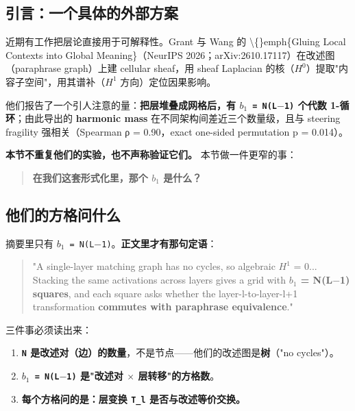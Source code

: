 \documentclass[11pt,a4paper]{ctexart}
\begin{document}
\subsection{引言：一个具体的外部方案}

近期有工作把层论直接用于可解释性。Grant 与 Wang 的 \textbackslash\{\}emph\{Gluing Local Contexts into Global Meaning\}（NeurIPS 2026；arXiv:2610.17117）在改述图（paraphrase graph）上建 cellular sheaf，用 sheaf Laplacian 的核（\texttt{\ensuremath{H^{0}}}）提取"内容子空间"，用其谱补（\texttt{\ensuremath{H^{1}}} 方向）定位因果影响。

他们报告了一个引人注意的量：\textbf{把层堆叠成网格后，有 \texttt{\ensuremath{b_{1}} = N(L\ensuremath{-}1)} 个代数 1-循环}；由此导出的 \textbf{harmonic mass} 在不同架构间差近三个数量级，且与 steering fragility 强相关（Spearman ρ = 0.90，exact one-sided permutation p = 0.014）。

\textbf{本节不重复他们的实验，也不声称验证它们。} 本节做一件更窄的事：

\begin{quote}
\textbf{在我们这套形式化里，那个 \texttt{\ensuremath{b_{1}}} 是什么？}
\end{quote}

\subsection{他们的方格问什么}

摘要里只有 \texttt{\ensuremath{b_{1}} = N(L\ensuremath{-}1)}。\textbf{正文里才有那句定语}：

\begin{quote}
"A single-layer matching graph has no cycles, so algebraic \ensuremath{H^{1}} = 0... Stacking the same activations across layers gives a grid with \textbf{\ensuremath{b_{1}} = N(L\ensuremath{-}1) squares}, and each square asks whether the layer-l-to-layer-l+1 transformation \textbf{commutes with paraphrase equivalence}."
\end{quote}

三件事必须读出来：

\begin{enumerate}
\item \textbf{\texttt{N} 是改述对（边）的数量}，不是节点——他们的改述图是\textbf{树}（"no cycles"）。
\item \textbf{\texttt{\ensuremath{b_{1}} = N(L\ensuremath{-}1)} 是"改述对 \ensuremath{\times} 层转移"的方格数}。
\item \textbf{每个方格问的是：层变换 \texttt{T\_l} 是否与改述等价交换。}
\end{enumerate}
\end{document}
